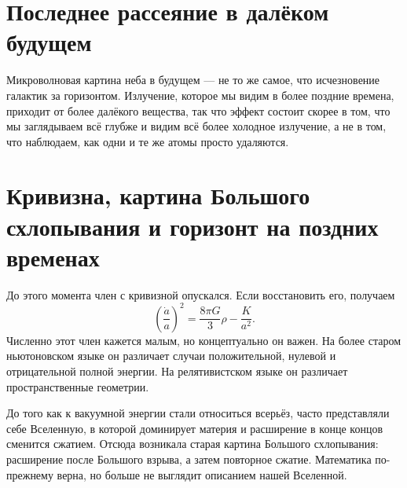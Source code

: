 \section{Последнее рассеяние в далёком будущем}

Микроволновая картина неба в будущем — не то же самое, что исчезновение галактик за горизонтом. Излучение, которое мы видим в более поздние времена, приходит от более далёкого вещества, так что эффект состоит скорее в том, что мы заглядываем всё глубже и видим всё более холодное излучение, а не в том, что наблюдаем, как одни и те же атомы просто удаляются.

\begin{classroomqa}
\end{classroomqa}

\section{Кривизна, картина Большого схлопывания и горизонт на поздних временах}

До этого момента член с кривизной опускался. Если восстановить его, получаем
\begin{equation}
\left(\frac{\dot a}{a}\right)^2
=
\frac{8\pi G}{3}\rho
-
\frac{K}{a^2}.
\end{equation}
Численно этот член кажется малым, но концептуально он важен. На более старом ньютоновском языке он различает случаи положительной, нулевой и отрицательной полной энергии. На релятивистском языке он различает пространственные геометрии.

До того как к вакуумной энергии стали относиться всерьёз, часто представляли себе Вселенную, в которой доминирует материя и расширение в конце концов сменится сжатием. Отсюда возникала старая картина Большого схлопывания: расширение после Большого взрыва, а затем повторное сжатие. Математика по-прежнему верна, но больше не выглядит описанием нашей Вселенной.

\begin{classroomqa}
\end{classroomqa}

